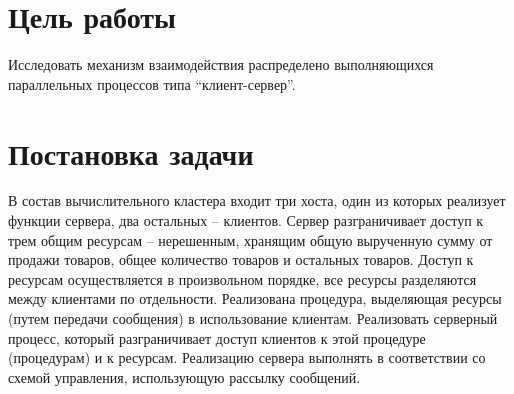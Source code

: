 \documentclass[a4paper,14pt]{extarticle}
\begin{document}


\section{Цель работы}
Исследовать механизм взаимодействия распределено выполняющихся параллельных
процессов типа \enquote{клиент-сервер}.

\section{Постановка задачи}
В состав вычислительного кластера входит три хоста, один из которых реализует
функции сервера, два остальных – клиентов. Сервер разграничивает доступ к трем
общим ресурсам – нерешенным, хранящим общую вырученную сумму от продажи товаров,
общее количество товаров и остальных товаров. Доступ к ресурсам осуществляется в
произвольном порядке, все ресурсы разделяются между клиентами по отдельности.
Реализована процедура, выделяющая ресурсы (путем передачи сообщения) в
использование клиентам. Реализовать серверный процесс, который разграничивает
доступ клиентов к этой процедуре (процедурам) и к ресурсам. Реализацию сервера
выполнять в соответствии со схемой управления, использующую рассылку сообщений.
\end{document}
